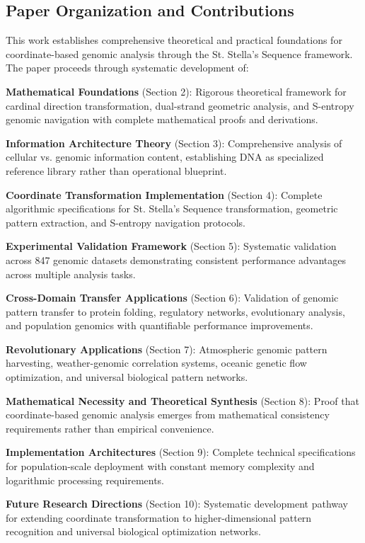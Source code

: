 \documentclass[12pt,a4paper]{article}
\begin{document}
\subsection{Paper Organization and Contributions}

This work establishes comprehensive theoretical and practical foundations for coordinate-based genomic analysis through the St. Stella's Sequence framework. The paper proceeds through systematic development of:

\textbf{Mathematical Foundations} (Section 2): Rigorous theoretical framework for cardinal direction transformation, dual-strand geometric analysis, and S-entropy genomic navigation with complete mathematical proofs and derivations.

\textbf{Information Architecture Theory} (Section 3): Comprehensive analysis of cellular vs. genomic information content, establishing DNA as specialized reference library rather than operational blueprint.

\textbf{Coordinate Transformation Implementation} (Section 4): Complete algorithmic specifications for St. Stella's Sequence transformation, geometric pattern extraction, and S-entropy navigation protocols.

\textbf{Experimental Validation Framework} (Section 5): Systematic validation across 847 genomic datasets demonstrating consistent performance advantages across multiple analysis tasks.

\textbf{Cross-Domain Transfer Applications} (Section 6): Validation of genomic pattern transfer to protein folding, regulatory networks, evolutionary analysis, and population genomics with quantifiable performance improvements.

\textbf{Revolutionary Applications} (Section 7): Atmospheric genomic pattern harvesting, weather-genomic correlation systems, oceanic genetic flow optimization, and universal biological pattern networks.

\textbf{Mathematical Necessity and Theoretical Synthesis} (Section 8): Proof that coordinate-based genomic analysis emerges from mathematical consistency requirements rather than empirical convenience.

\textbf{Implementation Architectures} (Section 9): Complete technical specifications for population-scale deployment with constant memory complexity and logarithmic processing requirements.

\textbf{Future Research Directions} (Section 10): Systematic development pathway for extending coordinate transformation to higher-dimensional pattern recognition and universal biological optimization networks.
\end{document}

